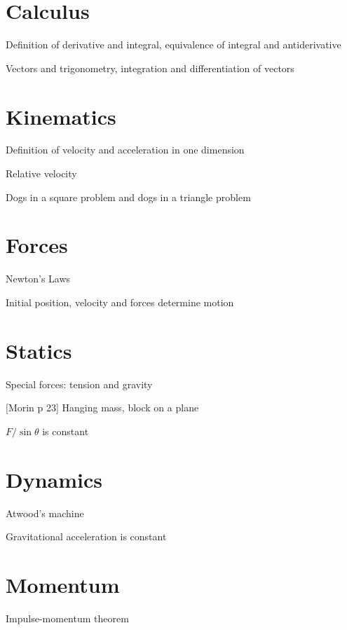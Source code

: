 \documentclass{article}
\title{}
\date{}
\newcommand{\<}{\langle}
\renewcommand{\>}{\rangle}
\begin{document}
\maketitle

\section{Calculus}

Definition of derivative and integral, equivalence of integral and antiderivative

Vectors and trigonometry, integration and differentiation of vectors

\section{Kinematics}

Definition of velocity and acceleration in one dimension

Relative velocity

Dogs in a square problem and dogs in a triangle problem

\section{Forces}

Newton's Laws

Initial position, velocity and forces determine motion

\section{Statics}

Special forces: tension and gravity

[Morin p 23] Hanging mass, block on a plane

$F/\sin\theta$ is constant

\section{Dynamics}

Atwood's machine

Gravitational acceleration is constant

\section{Momentum}

Impulse-momentum theorem
\end{document}
